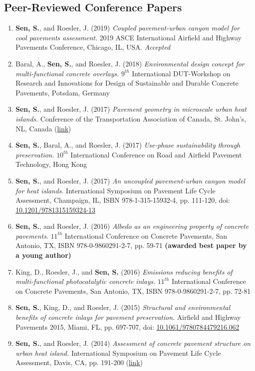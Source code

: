 \documentclass[12pt]{article}
\begin{document}
\subsection*{Peer-Reviewed Conference Papers}
\begin{enumerate}[label=(C\arabic*)]
	\item \textbf{Sen, S.}, and Roesler, J. (2019) \textit{Coupled pavement-urban canyon model for cool pavements assessment.} 2019 ASCE International Airfield and Highway Pavements Conference, Chicago, IL, USA. \textit{Accepted}
	\item Baral, A., \textbf{Sen, S.}, and Roesler, J. (2018) \textit{Environmental design concept for multi-functional concrete overlays.} $9^{th}$ International DUT-Workshop on Research and Innovations for Design of Sustainable and Durable Concrete Pavements, Potsdam, Germany
	\item \textbf{Sen, S.}, and Roesler, J. (2017) \textit{Pavement geometry in microscale urban heat islands.} Conference of the Transportation Association of Canada, St. John’s, NL, Canada (\href{http://www.tac-atc.ca/sites/default/files/conf_papers/sens_-_pavement_geometry_in_microscale_urban_heat_islands.pdf}{link})
	\item \textbf{Sen, S.}, Baral, A., and Roesler, J. (2017) \textit{Use-phase sustainability through preservation.} $10^{th}$ International Conference on Road and Airfield Pavement Technology, Hong Kong
	\item \textbf{Sen, S.}, and Roesler, J. (2017) \textit{An uncoupled pavement-urban canyon model for heat islands.} International Symposium on Pavement Life Cycle Assessment, Champaign, IL, ISBN 978-1-315-15932-4, pp. 111-120, doi: \href{http://dx.doi.org/10.1201/9781315159324-13}{10.1201/9781315159324-13}
	\item \textbf{Sen, S.}, and Roesler, J. (2016) \textit{Albedo as an engineering property of concrete pavements.} $11^{th}$ International Conference on Concrete Pavements, San Antonio, TX, ISBN 978-0-9860291-2-7, pp. 59-71 \textbf{(awarded best paper by a young author)}
	\item King, D., Roesler, J., and \textbf{Sen, S.} (2016) \textit{Emissions reducing benefits of multi-functional photocatalytic concrete inlays.} $11^{th}$ International Conference on Concrete Pavements, San Antonio, TX, ISBN 978-0-9860291-2-7, pp. 72-81
	\item \textbf{Sen, S.}, King, D., and Roesler, J. (2015) \textit{Structural and environmental benefits of concrete inlays for pavement preservation.} Airfield and Highway Pavements 2015, Miami, FL, pp. 697-707, doi: \href{http://dx.doi.org/10.1061/9780784479216.062}{10.1061/9780784479216.062}
	\item \textbf{Sen, S.}, and Roesler, J. (2014) \textit{Assessment of concrete pavement structure on urban heat island.} International Symposium on Pavement Life Cycle Assessment, Davis, CA, pp. 191-200 (\href{http://www.ucprc.ucdavis.edu/p-LCA2014/media/pdf/Papers/LCA14_Urban\%20Heat\%20Island.pdf}{link})
\end{enumerate}
\end{document}
